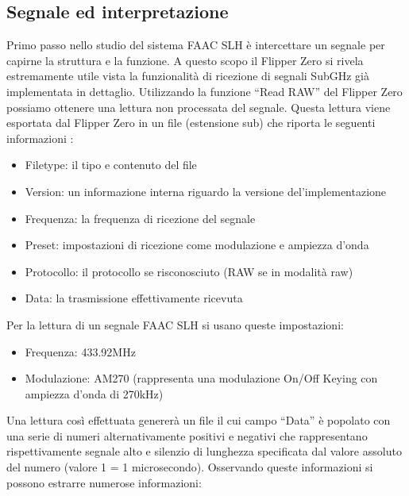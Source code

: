 \subsection{Segnale ed interpretazione}
\label{sub:signal}

Primo passo nello studio del sistema FAAC SLH è intercettare un segnale per capirne la struttura e la funzione. A questo scopo il Flipper Zero si rivela estremamente utile vista la funzionalità di ricezione di segnali SubGHz già implementata in dettaglio. Utilizzando la funzione “Read RAW” del Flipper Zero possiamo ottenere una lettura non processata del segnale. Questa lettura viene esportata dal Flipper Zero in un file (estensione sub) che riporta le seguenti informazioni \cite{subghz}:
\begin{itemize}
  \item Filetype: il tipo e contenuto del file
  \item Version: un informazione interna riguardo la versione del’implementazione
  \item Frequenza: la frequenza di ricezione del segnale
  \item Preset: impostazioni di ricezione come modulazione e ampiezza d’onda
  \item Protocollo: il protocollo se risconosciuto (RAW se in modalità raw)
  \item Data: la trasmissione effettivamente ricevuta
\end{itemize}
Per la lettura di un segnale FAAC SLH si usano queste impostazioni:
\begin{itemize}
  \item Frequenza: 433.92MHz
  \item Modulazione: AM270 (rappresenta una modulazione On/Off Keying con ampiezza d’onda di 270kHz)
\end{itemize}
Una lettura così effettuata genererà un file il cui campo “Data” è popolato con una serie di numeri alternativamente positivi e negativi che rappresentano rispettivamente segnale alto e silenzio di lunghezza specificata dal valore assoluto del numero (valore 1 = 1 microsecondo). Osservando queste informazioni si possono estrarre numerose informazioni:
